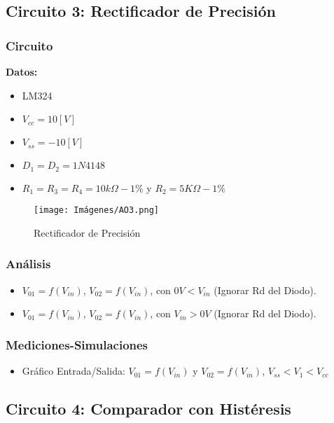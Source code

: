 \subsection{Circuito 3: Rectificador de Precisión}
    \subsubsection{Circuito}
    	\begin{center}
            \textbf{Datos:}
        \end{center}
        \begin{itemize}
            \item LM324
            \item $V_{cc}= 10 [V]$
            \item $V_{ss}= -10 [V]$
            \item $D_1 = D_2 = 1N4148$
            \item $R_1 = R_3 = R_4 = 10k\Omega-1\%$ y $ R_2 = 5K\Omega-1\% $
        \end{itemize}
    	\begin{figure}[ht]
    		\centering
    		\texttt{[image: Imágenes/AO3.png]}
    		\caption{Rectificador de Precisión}
    	\end{figure}
     
     \subsubsection{Análisis}
        \begin{itemize}
            \item $V_{01} = f(V_{in})$, $V_{02} = f(V_{in})$, con $0V<V_{in}$ (Ignorar Rd del Diodo).
            \item $V_{01} = f(V_{in})$, $V_{02} = f(V_{in})$, con $V_{in}>0V$ (Ignorar Rd del Diodo).
        \end{itemize}

    \subsubsection{Mediciones-Simulaciones}
        \begin{itemize}
            \item Gráfico Entrada/Salida: $V_{01} = f(V_{in})$ y $V_{02} = f(V_{in})$, $V_{ss}<V_1<V_{cc}$ 
        \end{itemize}
        
\subsection{Circuito 4: Comparador con Histéresis}
